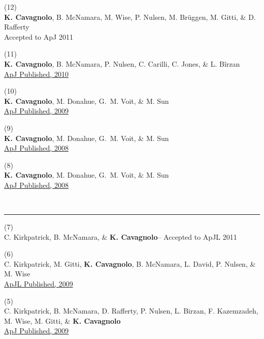 \documentclass[12pt]{cv}
\begin{document}
(12) {}\\
{\bf K. Cavagnolo}, B. McNamara, M. Wise, P. Nulsen, M. Br\"uggen, M. Gitti, \& D. Rafferty\\ 
Accepted to ApJ 2011

(11) {}\\
{\bf K. Cavagnolo}, B. McNamara, P. Nulsen, C. Carilli, C. Jones, \& L. B\^irzan\\ 
\href{http://adsabs.harvard.edu/abs/2010ApJ...720.1066C}{ApJ Published, 2010}

(10) {}\\
{\bf K. Cavagnolo}, M. Donahue, G.~M. Voit, \& M. Sun\\ 
\href{http://adsabs.harvard.edu/abs/2009ApJS..182...12C}{ApJ Published, 2009}

(9) {}\\
{\bf K. Cavagnolo}, M. Donahue, G.~M. Voit, \& M. Sun\\ 
\href{http://adsabs.harvard.edu/abs/2008ApJ...683L.107C}{ApJ Published, 2008}

(8) {}\\
{\bf K. Cavagnolo}, M. Donahue, G.~M. Voit, \& M. Sun\\
\href{http://adsabs.harvard.edu/abs/2008ApJ...682..821C}{ApJ Published, 2008}

{\large{}}\vspace{-0.3cm}\\
\rule{\linewidth}{0.5pt}
(7) {}\\
C. Kirkpatrick, B. McNamara, \& {\bf K. Cavagnolo}--
Accepted to ApJL 2011

(6) {}\\
C. Kirkpatrick, M. Gitti, {\bf K. Cavagnolo}, B. McNamara, L. David, P. Nulsen, \& M. Wise\\
\href{http://adsabs.harvard.edu/abs/2009arXiv0909.2252K}{ApJL Published, 2009}

(5) {}\\
C. Kirkpatrick, B. McNamara, D. Rafferty, P. Nulsen, L. Birzan, F. Kazemzadeh, M. Wise, M. Gitti, \& {\bf K. Cavagnolo}\\
\href{http://adsabs.harvard.edu/abs/2009ApJ...697..867K}{ApJ Published, 2009}
\end{document}
